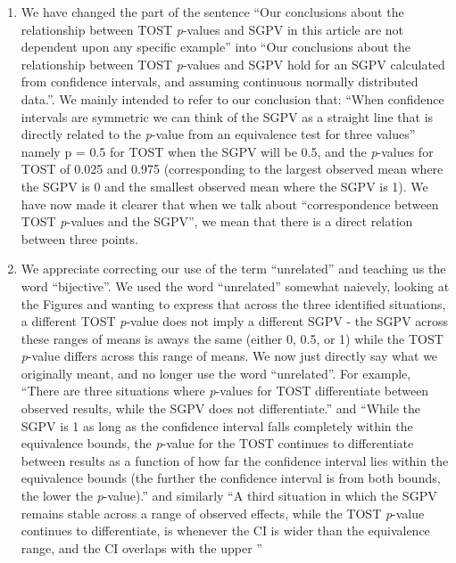 \documentclass[man]{apa6}
\begin{document}
\begin{enumerate}
\def\labelenumi{\arabic{enumi}.}
\item
  We have changed the part of the sentence \enquote{Our conclusions
  about the relationship between TOST \emph{p}-values and SGPV in this
  article are not dependent upon any specific example} into \enquote{Our
  conclusions about the relationship between TOST \emph{p}-values and
  SGPV hold for an SGPV calculated from confidence intervals, and
  assuming continuous normally distributed data.}. We mainly intended to
  refer to our conclusion that: \enquote{When confidence intervals are
  symmetric we can think of the SGPV as a straight line that is directly
  related to the \emph{p}-value from an equivalence test for three
  values} namely p = 0.5 for TOST when the SGPV will be 0.5, and the
  \emph{p}-values for TOST of 0.025 and 0.975 (corresponding to the
  largest observed mean where the SGPV is 0 and the smallest observed
  mean where the SGPV is 1). We have now made it clearer that when we
  talk about \enquote{correspondence between TOST \emph{p}-values and
  the SGPV}, we mean that there is a direct relation between three
  points.
\item
  We appreciate correcting our use of the term \enquote{unrelated} and
  teaching us the word \enquote{bijective}. We used the word
  \enquote{unrelated} somewhat naievely, looking at the Figures and
  wanting to express that across the three identified situations, a
  different TOST \emph{p}-value does not imply a different SGPV - the
  SGPV across these ranges of means is aways the same (either 0, 0.5, or
  1) while the TOST \emph{p}-value differs across this range of means.
  We now just directly say what we originally meant, and no longer use
  the word \enquote{unrelated}. For example, \enquote{There are three
  situations where \emph{p}-values for TOST differentiate between
  observed results, while the SGPV does not differentiate.} and
  \enquote{While the SGPV is 1 as long as the confidence interval falls
  completely within the equivalence bounds, the \emph{p}-value for the
  TOST continues to differentiate between results as a function of how
  far the confidence interval lies within the equivalence bounds (the
  further the confidence interval is from both bounds, the lower the
  \emph{p}-value).} and similarly \enquote{A third situation in which
  the SGPV remains stable across a range of observed effects, while the
  TOST \emph{p}-value continues to differentiate, is whenever the CI is
  wider than the equivalence range, and the CI overlaps with the upper
}
\end{enumerate}
\end{document}
